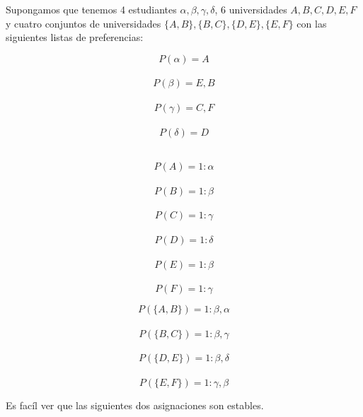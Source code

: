 \begin{eje} \cite{Todo}
Supongamos que tenemos 4 estudiantes $\alpha,\beta,\gamma,\delta$, 6 universidades $A,B,C,D,E,F$ y cuatro conjuntos de universidades $\{A,B\},\{B,C\},\{D,E\},\{E,F\}$ con las siguientes listas de preferencias:
\noindent \begin{minipage}{.3\linewidth}
$$P(\alpha)=A$$ \\
$$P(\beta)=E,B$$ \\
$$P(\gamma)=C,F$$ \\
 $$P(\delta)=D$$ \\
\end{minipage}%
\begin{minipage}{.3\linewidth}
$$P(A)=1:\alpha$$ \\
$$P(B)=1:\beta$$ \\
$$P(C)=1: \gamma$$ \\
$$P(D)=1:  \delta$$ \\
$$P(E)=1:  \beta$$ \\
$$P(F)=1:  \gamma$$ 
\end{minipage}
\begin{minipage}{.4\linewidth}
$$P(\{A,B\})= 1:\beta,\alpha$$ \\
$$P(\{B,C\})=1:\beta,\gamma$$ \\
$$P(\{D,E\})= 1:\beta,\delta$$ \\
$$P(\{E,F\})=1:\gamma,\beta$$
\end{minipage}

Es facíl ver que las siguientes dos asignaciones son estables.\\

\begin{figure}[H]
\begin{minipage}{.5\linewidth}
\begin{figure}[H]\centering

\end{figure}
\end{minipage}
\end{figure}
\end{eje}
